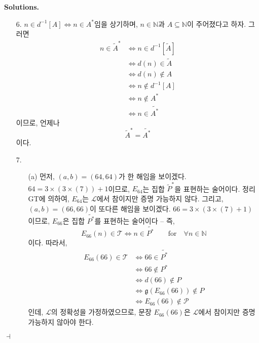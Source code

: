 \documentclass[12pt]{paper}
\newcommand{\gnum}
{ \mathfrak{g} }
\newenvironment{context}[1][]
{ \noindent \textbf{{#1}.}
}
{ \hfill $ \dashv $ }
\begin{document}
\begin{context}[Solutions]
\begin{enumerate}
\item[{6.}] $n \in d^{-1} \left[ A \right] \iff n \in A^{*} $임을 상기하며,
$n \in \mathbb{N}$과 $A \subseteq \mathbb{N}$이 주어졌다고 하자. 그러면
\begin{align*}
n \in \widetilde{A}^{*}
& \iff n \in d^{-1} \left[ \widetilde{A} \right] \\
& \iff d \left( n \right) \in \widetilde{A} \\
& \iff d \left( n \right) \notin A \\
& \iff n \notin d^{-1} \left[ A \right] \\
& \iff n \notin A^{*} \\
& \iff n \in \widetilde{A^{*}}
\end{align*}
이므로, 언제나 $$\widetilde{A}^{*} = \widetilde{A^{*}}$$이다.

\item[{7.}]
\begin{itemize}
\item[(a)] 먼저, $\left( a , b \right) = \left( 64 , 64 \right)$가 한 해임을 보이겠다. 
$64 = 3 \times \left( 3 \times \left( 7 \right) \right) + 1$이므로,
$E_{64}$는 집합 $\widetilde{P}^{*}$을 표현하는 술어이다.
정리 GT에 의하여, $E_{64}$는 $\mathcal{L}$에서 참이지만 증명 가능하지 않다.
그리고, $\left( a , b \right) = \left( 66 , 66 \right)$이 또다른 해임을 보이겠다.
$66 = 3 \times \left( 3 \times \left( 7 \right) + 1 \right)$이므로,
$E_{66}$은 집합 $\widetilde{P^{*}}$를 표현하는 술어이다 --
즉, $$ E_{66} \left( n \right) \in \mathcal{T} \iff n \in \widetilde{P^{*}} \qquad \mathrm{for} \quad \forall n \in \mathbb{N} $$이다.
따라서,
\begin{align*}
E_{66} \left( 66 \right) \in \mathcal{T}
& \iff 66 \in \widetilde{P^{*}} \\
& \iff 66 \notin P^{*} \\
& \iff d \left( 66 \right) \notin P \\
& \iff \gnum \left( E_{66} \left( 66 \right) \right) \notin P \\
& \iff E_{66} \left( 66 \right) \notin \mathcal{P}
\end{align*}
인데, $\mathcal{L}$의 정확성을 가정하였으므로,
문장 $E_{66} \left( 66 \right)$은 $\mathcal{L}$에서 참이지만 증명 가능하지 않아야 한다.


\end{itemize}
\end{enumerate}
\end{context}
\end{document}
